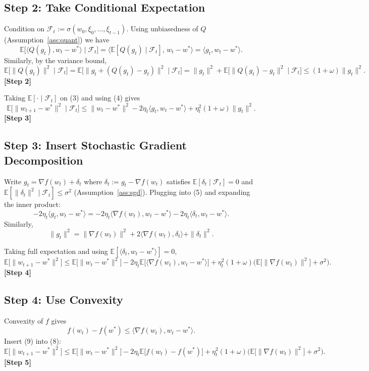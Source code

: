 \documentclass{article}
\newcommand{\E}{\mathbb{E}}
\begin{document}
\subsection*{Step 2: Take Conditional Expectation}
Condition on $\mathcal{F}_{t}:=\sigma(w_{0},\xi_{0},\dots,\xi_{t-1})$. Using unbiasedness of $Q$ (Assumption~\ref{ass:quant}) we have
\[
\E\!\big[\langle Q(g_{t}),w_{t}-w^{*}\rangle\mid\mathcal{F}_{t}\big]
= \langle \E[Q(g_{t})\mid\mathcal{F}_{t}],\,w_{t}-w^{*}\rangle
= \langle g_{t},w_{t}-w^{*}\rangle.
\]
Similarly, by the variance bound,
\[
\E\!\big[\|Q(g_{t})\|^{2}\mid\mathcal{F}_{t}\big]
= \E\!\big[\|g_{t}+ (Q(g_{t})-g_{t})\|^{2}\mid\mathcal{F}_{t}\big]
= \|g_{t}\|^{2}+\E\!\big[\|Q(g_{t})-g_{t}\|^{2}\mid\mathcal{F}_{t}\big]
\le (1+\omega)\|g_{t}\|^{2}. \tag{4}
\]
\textbf{[Step 2]}

Taking $\E[\cdot\mid\mathcal{F}_{t}]$ on (3) and using (4) gives
\[
\E\!\big[\|w_{t+1}-w^{*}\|^{2}\mid\mathcal{F}_{t}\big]
\le \|w_{t}-w^{*}\|^{2}
-2\eta_{t}\langle g_{t},w_{t}-w^{*}\rangle
+\eta_{t}^{2}(1+\omega)\|g_{t}\|^{2}. \tag{5}
\]
\textbf{[Step 3]}

\subsection*{Step 3: Insert Stochastic Gradient Decomposition}
Write $g_{t}= \nabla f(w_{t})+\delta_{t}$ where $\delta_{t}:=g_{t}-\nabla f(w_{t})$ satisfies $\E[\delta_{t}\mid\mathcal{F}_{t}]=0$ and $\E[\|\delta_{t}\|^{2}\mid\mathcal{F}_{t}]\le\sigma^{2}$ (Assumption~\ref{ass:sgd}).  
Plugging into (5) and expanding the inner product:
\[
-2\eta_{t}\langle g_{t},w_{t}-w^{*}\rangle
= -2\eta_{t}\langle\nabla f(w_{t}),w_{t}-w^{*}\rangle
-2\eta_{t}\langle\delta_{t},w_{t}-w^{*}\rangle. \tag{6}
\]
Similarly,
\[
\|g_{t}\|^{2}= \|\nabla f(w_{t})\|^{2}+2\langle\nabla f(w_{t}),\delta_{t}\rangle+\|\delta_{t}\|^{2}. \tag{7}
\]

Taking full expectation and using $\E[\langle\delta_{t},w_{t}-w^{*}\rangle]=0$,
\[
\E\!\big[\|w_{t+1}-w^{*}\|^{2}\big]
\le \E\!\big[\|w_{t}-w^{*}\|^{2}\big]
-2\eta_{t}\E\!\big[\langle\nabla f(w_{t}),w_{t}-w^{*}\rangle\big]
+\eta_{t}^{2}(1+\omega)\big(\E\!\big[\|\nabla f(w_{t})\|^{2}\big]+\sigma^{2}\big). \tag{8}
\]
\textbf{[Step 4]}

\subsection*{Step 4: Use Convexity}
Convexity of $f$ gives
\[
f(w_{t})-f(w^{*})\le \langle\nabla f(w_{t}),w_{t}-w^{*}\rangle. \tag{9}
\]
Insert (9) into (8):
\[
\E\!\big[\|w_{t+1}-w^{*}\|^{2}\big]
\le \E\!\big[\|w_{t}-w^{*}\|^{2}\big]
-2\eta_{t}\E\!\big[f(w_{t})-f(w^{*})\big]
+\eta_{t}^{2}(1+\omega)\big(\E\!\big[\|\nabla f(w_{t})\|^{2}\big]+\sigma^{2}\big). \tag{10}
\]
\textbf{[Step 5]}
\end{document}
